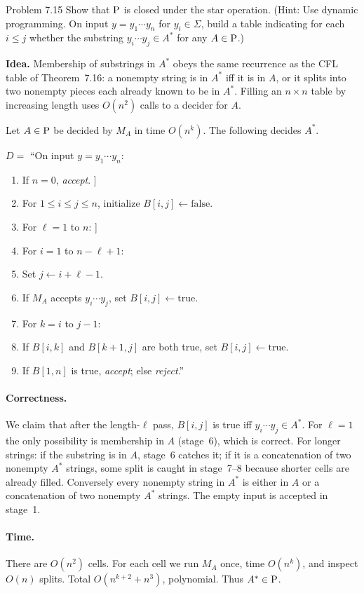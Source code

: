 \begin{question}{Problem 7.15}
Show that $\mathrm{P}$ is closed under the star operation. (Hint: Use dynamic programming. On input $y=y_1\cdots y_n$ for $y_i\in\Sigma$, build a table indicating for each $i\le j$ whether the substring $y_i\cdots y_j\in A^*$ for any $A\in\mathrm{P}$.)
\end{question}
\begin{soln}
\textbf{Idea.} Membership of substrings in $A^*$ obeys the same recurrence as the CFL table of Theorem~7.16: a nonempty string is in $A^*$ iff it is in $A$, or it splits into two nonempty pieces each already known to be in $A^*$. Filling an $n\times n$ table by increasing length uses $O(n^2)$ calls to a decider for $A$.

Let $A\in\mathrm{P}$ be decided by $M_A$ in time $O(n^k)$. The following decides $A^*$.

$D=$ ``On input $y=y_1\cdots y_n$:
\begin{enumerate}
\item If $n=0$, \emph{accept}. \quad[[ $\eps\in A^*$ always ]]
\item For $1\le i\le j\le n$, initialize $B[i,j]\leftarrow\mathrm{false}$.
\item For $\ell=1$ to $n$: \quad[[ $\ell=$ substring length ]]
\item \quad For $i=1$ to $n-\ell+1$:
\item \qquad Set $j\leftarrow i+\ell-1$.
\item \qquad If $M_A$ accepts $y_i\cdots y_j$, set $B[i,j]\leftarrow\mathrm{true}$.
\item \qquad For $k=i$ to $j-1$:
\item \qquad\quad If $B[i,k]$ and $B[k+1,j]$ are both true, set $B[i,j]\leftarrow\mathrm{true}$.
\item If $B[1,n]$ is true, \emph{accept}; else \emph{reject}.''
\end{enumerate}

\paragraph{Correctness.}
We claim that after the length-$\ell$ pass, $B[i,j]$ is true iff $y_i\cdots y_j\in A^*$. For $\ell=1$ the only possibility is membership in $A$ (stage~6), which is correct. For longer strings: if the substring is in $A$, stage~6 catches it; if it is a concatenation of two nonempty $A^*$ strings, some split is caught in stage~7--8 because shorter cells are already filled. Conversely every nonempty string in $A^*$ is either in $A$ or a concatenation of two nonempty $A^*$ strings. The empty input is accepted in stage~1.

\paragraph{Time.}
There are $O(n^2)$ cells. For each cell we run $M_A$ once, time $O(n^k)$, and inspect $O(n)$ splits. Total $O(n^{k+2}+n^3)$, polynomial. Thus $A^*\in\mathrm{P}$.
\end{soln}

